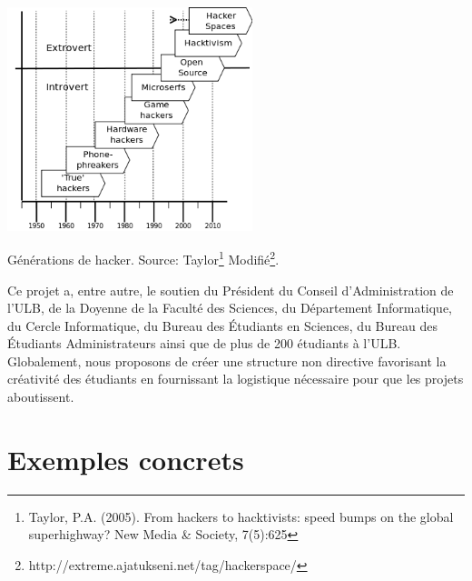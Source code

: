\documentclass{article}
\begin{document}
\begin{center}
\includegraphics[height=65mm]{hacker-generations-divided.png}

Générations de hacker. Source: Taylor\footnote{Taylor,  P.A. (2005). From hackers to hacktivists: speed bumps on the global  superhighway? New Media \& Society, 7(5):625} Modifié\footnote{http://extreme.ajatukseni.net/tag/hackerspace/}.
\end{center}

Ce projet a, entre autre, le soutien du Président du Conseil d'Administration de l'ULB, de la Doyenne de la Faculté des Sciences, du Département Informatique, du Cercle Informatique, du Bureau des Étudiants en Sciences, du Bureau des Étudiants Administrateurs ainsi que de plus de 200 étudiants à l'ULB. Globalement, nous proposons de créer une structure non directive favorisant la créativité des étudiants en fournissant la logistique nécessaire pour que les projets aboutissent.

\section{Exemples concrets}
\end{document}
